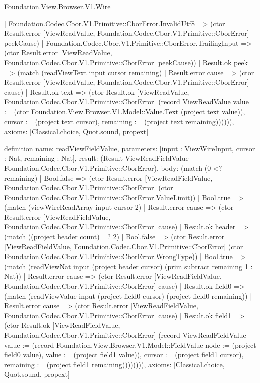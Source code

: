 \begin{lexlean}{Foundation.View.Browser.V1.Wire}
\begin{semanticmodule}
{        | Foundation.Codec.Cbor.V1.Primitive::CborError.InvalidUtf8 => (ctor Result.error [ViewReadValue, Foundation.Codec.Cbor.V1.Primitive::CborError] peekCause)
        | Foundation.Codec.Cbor.V1.Primitive::CborError.TrailingInput => (ctor Result.error [ViewReadValue, Foundation.Codec.Cbor.V1.Primitive::CborError] peekCause))
      | Result.ok peek => (match (readViewText input cursor remaining)
        | Result.error cause => (ctor Result.error [ViewReadValue, Foundation.Codec.Cbor.V1.Primitive::CborError] cause)
        | Result.ok text => (ctor Result.ok [ViewReadValue, Foundation.Codec.Cbor.V1.Primitive::CborError] (record ViewReadValue {value := (ctor Foundation.View.Browser.V1.Model::Value.Text (project text value)), cursor := (project text cursor), remaining := (project text remaining)}))))),
  axioms: [Classical.choice, Quot.sound, propext]
}

definition{
  name: readViewFieldValue,
  parameters: [input : ViewWireInput, cursor : Nat, remaining : Nat],
  result: (Result ViewReadFieldValue Foundation.Codec.Cbor.V1.Primitive::CborError),
  body: (match (0 <? remaining)
    | Bool.false => (ctor Result.error [ViewReadFieldValue, Foundation.Codec.Cbor.V1.Primitive::CborError] (ctor Foundation.Codec.Cbor.V1.Primitive::CborError.ValueLimit))
    | Bool.true => (match (viewWireReadArray input cursor 2)
      | Result.error cause => (ctor Result.error [ViewReadFieldValue, Foundation.Codec.Cbor.V1.Primitive::CborError] cause)
      | Result.ok header => (match ((project header count) =? 2)
        | Bool.false => (ctor Result.error [ViewReadFieldValue, Foundation.Codec.Cbor.V1.Primitive::CborError] (ctor Foundation.Codec.Cbor.V1.Primitive::CborError.WrongType))
        | Bool.true => (match (readViewNat input (project header cursor) (prim subtract remaining 1 : Nat))
          | Result.error cause => (ctor Result.error [ViewReadFieldValue, Foundation.Codec.Cbor.V1.Primitive::CborError] cause)
          | Result.ok field0 => (match (readViewValue input (project field0 cursor) (project field0 remaining))
            | Result.error cause => (ctor Result.error [ViewReadFieldValue, Foundation.Codec.Cbor.V1.Primitive::CborError] cause)
            | Result.ok field1 => (ctor Result.ok [ViewReadFieldValue, Foundation.Codec.Cbor.V1.Primitive::CborError] (record ViewReadFieldValue {value := (record Foundation.View.Browser.V1.Model::FieldValue {node := (project field0 value), value := (project field1 value)}), cursor := (project field1 cursor), remaining := (project field1 remaining)}))))))),
  axioms: [Classical.choice, Quot.sound, propext]
}


\end{semanticmodule}
\end{lexlean}
